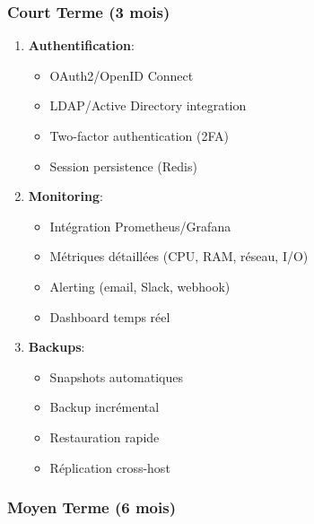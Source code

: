 \documentclass[12pt,a4paper]{article}
\begin{document}
\subsubsection{Court Terme (3 mois)}

\begin{enumerate}
    \item \textbf{Authentification}:
    \begin{itemize}
        \item OAuth2/OpenID Connect
        \item LDAP/Active Directory integration
        \item Two-factor authentication (2FA)
        \item Session persistence (Redis)
    \end{itemize}
    
    \item \textbf{Monitoring}:
    \begin{itemize}
        \item Intégration Prometheus/Grafana
        \item Métriques détaillées (CPU, RAM, réseau, I/O)
        \item Alerting (email, Slack, webhook)
        \item Dashboard temps réel
    \end{itemize}
    
    \item \textbf{Backups}:
    \begin{itemize}
        \item Snapshots automatiques
        \item Backup incrémental
        \item Restauration rapide
        \item Réplication cross-host
    \end{itemize}
\end{enumerate}

\subsubsection{Moyen Terme (6 mois)}
\end{document}
